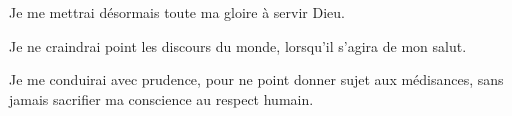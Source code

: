 \documentclass[instructions.tex]{subfiles}
\begin{document}
\primo Je me mettrai désormais toute ma gloire à servir Dieu.

\secundo Je ne craindrai point les discours du monde, lorsqu’il s’agira de mon salut.

\tertio Je me conduirai avec prudence, pour ne point donner sujet aux médisances, sans jamais sacrifier ma conscience au respect humain.

\end{document}
